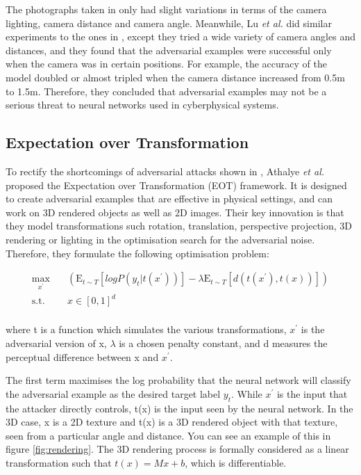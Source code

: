 The photographs taken in \cite{kurakin2016adversarial} only had slight variations in terms of the camera lighting, camera distance and camera angle. Meanwhile, Lu \textit{et al.} \cite{lu_physical_experiments} did similar experiments to the ones in \cite{kurakin2016adversarial}, except they tried a wide variety of camera angles and distances, and they found that the adversarial examples were successful only when the camera was in certain positions. For example, the accuracy of the model doubled or almost tripled when the camera distance increased from 0.5m to 1.5m. Therefore, they concluded that adversarial examples may not be a serious threat to neural networks used in cyberphysical systems.

\subsection{Expectation over Transformation}
    \label{subsubsec:eot}

To rectify the shortcomings of adversarial attacks shown in \cite{lu_physical_experiments}, Athalye \textit{et al.} \cite{athalye} proposed the Expectation over Transformation (EOT) framework. It is designed to create adversarial examples that are effective in physical settings, and can work on 3D rendered objects as well as 2D images. Their key innovation is that they model transformations such rotation, translation, perspective projection, 3D rendering or lighting in the optimisation search for the adversarial noise. Therefore, they formulate the following optimisation problem:

\begin{equation}
\begin{aligned}
\max_{x^\prime} \quad & (\mathrm{E}_{t\sim T}[log P(y_{t} | t(x^\prime))] - \lambda \mathrm{E}_{t\sim T}[d(t(x^\prime), t(x))])\\
\textrm{s.t.} \quad & x \in [0, 1]^d   \\
\end{aligned}
\end{equation}

\noindent where t is a function which simulates the various transformations, $x^\prime$ is the adversarial version of x, $\lambda$ is a chosen penalty constant, and d measures the perceptual difference between x and $x^\prime$. 

The first term maximises the log probability that the neural network will classify the adversarial example as the desired target label $y_{t}$. While $x^\prime$ is the input that the attacker directly controls, t(x) is the input seen by the neural network. In the 3D case, x is a 2D texture and t(x) is a 3D rendered object with that texture, seen from a particular angle and distance. You can see an example of this in figure \ref{fig:rendering}. The 3D rendering process is formally considered as a linear transformation such that $t(x) = Mx + b$, which is differentiable.

